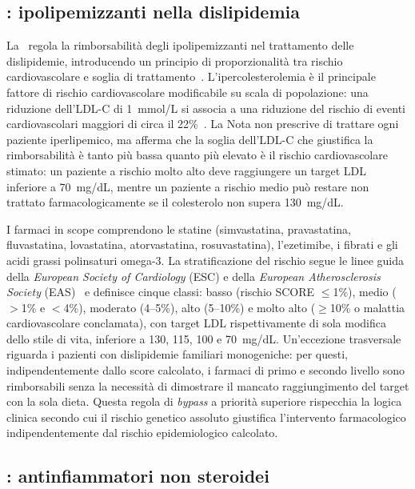 \subsection{\notetredici: ipolipemizzanti nella dislipidemia}
\label{subsec:nota13}

La \notetredici\ regola la rimborsabilità degli ipolipemizzanti nel trattamento
delle dislipidemie, introducendo un principio di proporzionalità tra rischio
cardiovascolare e soglia di trattamento~\cite{aifa2018nota13}.
L'ipercolesterolemia è il principale fattore di rischio cardiovascolare
modificabile su scala di popolazione: una riduzione dell'LDL-C di 1~mmol/L
si associa a una riduzione del rischio di eventi cardiovascolari maggiori di
circa il 22\%~\cite{atp2014cardio}.
La Nota non prescrive di trattare ogni paziente iperlipemico, ma afferma che
la soglia dell'LDL-C che giustifica la rimborsabilità è tanto più bassa quanto
più elevato è il rischio cardiovascolare stimato: un paziente a rischio molto
alto deve raggiungere un target LDL inferiore a 70~mg/dL, mentre un paziente
a rischio medio può restare non trattato farmacologicamente se il colesterolo
non supera 130~mg/dL.

I farmaci in scope comprendono le statine (simvastatina, pravastatina, fluvastatina,
lovastatina, atorvastatina, rosuvastatina), l'ezetimibe, i fibrati e gli acidi
grassi polinsaturi omega-3.
La stratificazione del rischio segue le linee guida della \emph{European Society of Cardiology} (ESC) e della \emph{European Atherosclerosis Society} (EAS)~\cite{escic2019dyslip}
e definisce cinque classi: basso (rischio SCORE $\leq$1\%), medio
($>$1\% e $<$4\%), moderato (4--5\%), alto (5--10\%) e molto alto ($\geq$10\% o malattia
cardiovascolare conclamata), con target LDL rispettivamente di sola modifica
dello stile di vita, inferiore a 130, 115, 100 e 70~mg/dL.
Un'eccezione trasversale riguarda i pazienti con dislipidemie familiari
monogeniche: per questi, indipendentemente dallo score calcolato, i farmaci
di primo e secondo livello sono rimborsabili senza la necessità di dimostrare
il mancato raggiungimento del target con la sola dieta.
Questa regola di \emph{bypass} a priorità superiore rispecchia la logica clinica
secondo cui il rischio genetico assoluto giustifica l'intervento farmacologico
indipendentemente dal rischio epidemiologico calcolato.

\subsection{\notesessanta: antinfiammatori non steroidei}
\label{subsec:nota66}


